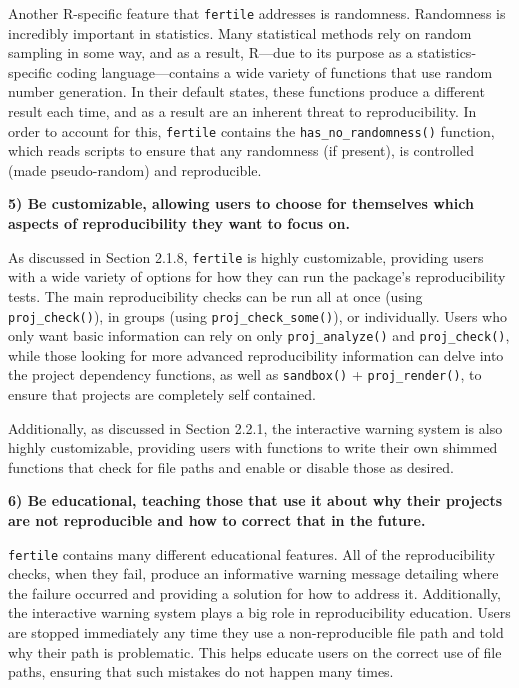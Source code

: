 \documentclass[12pt,twoside]{reedthesis}
\begin{document}
Another R-specific feature that \texttt{fertile} addresses is randomness. Randomness is incredibly important in statistics. Many statistical methods rely on random sampling in some way, and as a result, R---due to its purpose as a statistics-specific coding language---contains a wide variety of functions that use random number generation. In their default states, these functions produce a different result each time, and as a result are an inherent threat to reproducibility. In order to account for this, \texttt{fertile} contains the \texttt{has\_no\_randomness()} function, which reads scripts to ensure that any randomness (if present), is controlled (made pseudo-random) and reproducible.

\textbf{5) Be customizable, allowing users to choose for themselves which aspects of reproducibility they want to focus on.}

As discussed in Section 2.1.8, \texttt{fertile} is highly customizable, providing users with a wide variety of options for how they can run the package's reproducibility tests. The main reproducibility checks can be run all at once (using \texttt{proj\_check()}), in groups (using \texttt{proj\_check\_some()}), or individually. Users who only want basic information can rely on only \texttt{proj\_analyze()} and \texttt{proj\_check()}, while those looking for more advanced reproducibility information can delve into the project dependency functions, as well as \texttt{sandbox()} + \texttt{proj\_render()}, to ensure that projects are completely self contained.

Additionally, as discussed in Section 2.2.1, the interactive warning system is also highly customizable, providing users with functions to write their own shimmed functions that check for file paths and enable or disable those as desired.

\textbf{6) Be educational, teaching those that use it about why their projects are not reproducible and how to correct that in the future.}

\texttt{fertile} contains many different educational features. All of the reproducibility checks, when they fail, produce an informative warning message detailing where the failure occurred and providing a solution for how to address it. Additionally, the interactive warning system plays a big role in reproducibility education. Users are stopped immediately any time they use a non-reproducible file path and told why their path is problematic. This helps educate users on the correct use of file paths, ensuring that such mistakes do not happen many times.
\end{document}
